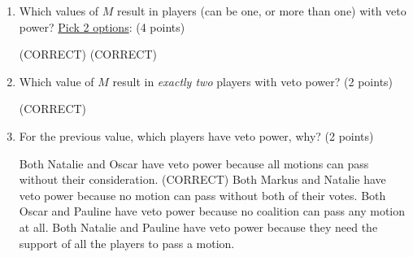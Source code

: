 \documentclass[12pt]{exam}
\begin{document}
\begin{enumerate}
\begin{enumerate}
\begin{checkboxes}
    \choice Oscar has no power because no motion can pass without their votes.
    \choice Oscar has no power because both Markus and Natalie or Markus and Pauline can pass resolutions on their own meaning Oscar's vote doesn't influence the decision.
    \choice Pauline has no power because they can pass motions single-handedly.
    \choice (CORRECT) Pauline has no power because both Markus and Natalie or Markus and Oscar can pass resolutions on their own meaning Pauline's vote doesn't influence the decision.
\end{checkboxes}
\vfill
\item Which values of $M$ result in players (can be one, or more than one) with veto power? \underline{Pick 2 options}: (4 points)
\begin{checkboxes}
    (CORRECT)
    (CORRECT)
\end{checkboxes}
\vfill
\item Which value of $M$ result in \emph{exactly two} players with veto power? (2 points)
\begin{checkboxes}
     (CORRECT)
\end{checkboxes}
\vfill
\item \label{lastQnSec2} For the previous value, which players have veto power, why? (2 points)
\begin{checkboxes}
    \choice Both Natalie and Oscar have veto power because all motions can pass without their consideration.
    \choice (CORRECT) Both Markus and Natalie have veto power because no motion can pass without both of their votes.
    \choice Both Oscar and Pauline have veto power because no coalition can pass any motion at all.
    \choice Both Natalie and Pauline have veto power because they need the support of all the players to pass a motion.
\end{checkboxes}
\vfill
\end{enumerate}
\newpage


\end{enumerate}
\end{document}
